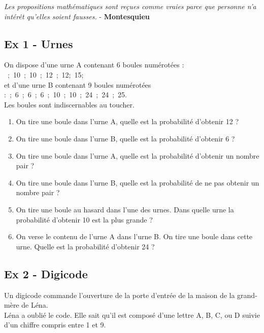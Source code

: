



\begin{center}
  \textit{Les propositions mathématiques sont reçues comme vraies parce que personne n’a intérêt qu’elles soient fausses.} - \textbf{Montesquieu}
\end{center}


\subsection*{Ex 1 - Urnes}

On dispose d'une urne A contenant 6 boules numérotées : ~;~10~;~10~;~12~;~12;~15; \\
et d'une urne B contenant 9 boules numérotées :~;~6~;~6~;~6~;~10~;~10~;~24~;~24~;~25. \\
Les boules sont indiscernables au toucher. \\

\medskip

	\begin{enumerate}
		\item On tire une boule dans l'urne A, quelle est la probabilité d'obtenir 12 ?
		\item On tire une boule dans l'urne B, quelle est la probabilité d'obtenir 6 ?
		\item On tire une boule dans l'urne A, quelle est la probabilité d'obtenir un nombre pair ?
		\item On tire une boule dans l'urne B, quelle est la probabilité de ne pas obtenir un nombre pair ?
		\item On tire une boule au hasard dans l'une des urnes. Dans quelle urne la probabilité d'obtenir 10 est la plus grande ?
		\item On verse le contenu de l'urne A dans l'urne B. On tire une boule dans cette urne. Quelle est la probabilité d'obtenir 24 ?
	\end{enumerate}

\subsection*{Ex 2 - Digicode}

Un digicode commande l'ouverture de la porte d'entrée de la maison de la grand-mère de Léna. \\
Léna a oublié le code. Elle sait qu'il est composé d'une lettre A, B, C, ou D suivie d'un chiffre compris entre 1 et 9.\\

